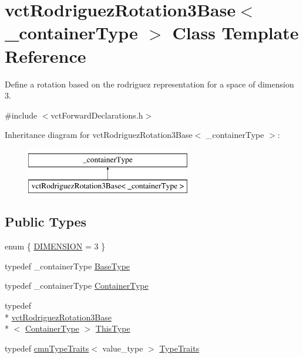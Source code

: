 \hypertarget{classvct_rodriguez_rotation3_base}{\section{vct\-Rodriguez\-Rotation3\-Base$<$ \-\_\-container\-Type $>$ Class Template Reference}
\label{classvct_rodriguez_rotation3_base}
}


Define a rotation based on the rodriguez representation for a space of dimension 3.  




{\ttfamily \#include $<$vct\-Forward\-Declarations.\-h$>$}

Inheritance diagram for vct\-Rodriguez\-Rotation3\-Base$<$ \-\_\-container\-Type $>$\-:\begin{figure}[H]
\begin{center}
\leavevmode
\includegraphics[height=2.000000cm]{d4/d21/classvct_rodriguez_rotation3_base}
\end{center}
\end{figure}
\subsection*{Public Types}
\begin{DoxyCompactItemize}
\item 
enum \{ \hyperlink{classvct_rodriguez_rotation3_base_a37ad88df67e2e291c207a9d2892148c1a251299ef32f4c700fad09c8639bcce3a}{D\-I\-M\-E\-N\-S\-I\-O\-N} = 3
 \}
\item 
typedef \-\_\-container\-Type \hyperlink{classvct_rodriguez_rotation3_base_a4269d1ae12fda0dd92eccb3ad5089ce5}{Base\-Type}
\item 
typedef \-\_\-container\-Type \hyperlink{classvct_rodriguez_rotation3_base_a121aa7d7f143b0c59ef190ff9bff57d2}{Container\-Type}
\item 
typedef \\*
\hyperlink{classvct_rodriguez_rotation3_base}{vct\-Rodriguez\-Rotation3\-Base}\\*
$<$ \hyperlink{classvct_rodriguez_rotation3_base_a121aa7d7f143b0c59ef190ff9bff57d2}{Container\-Type} $>$ \hyperlink{classvct_rodriguez_rotation3_base_add2bccab7f6e86c98b3f97fd00b06dcc}{This\-Type}
\item 
typedef \hyperlink{classcmn_type_traits}{cmn\-Type\-Traits}$<$ value\-\_\-type $>$ \hyperlink{classvct_rodriguez_rotation3_base_a862714ccf1a5b0f77a49e7983204474f}{Type\-Traits}
\end{DoxyCompactItemize}
